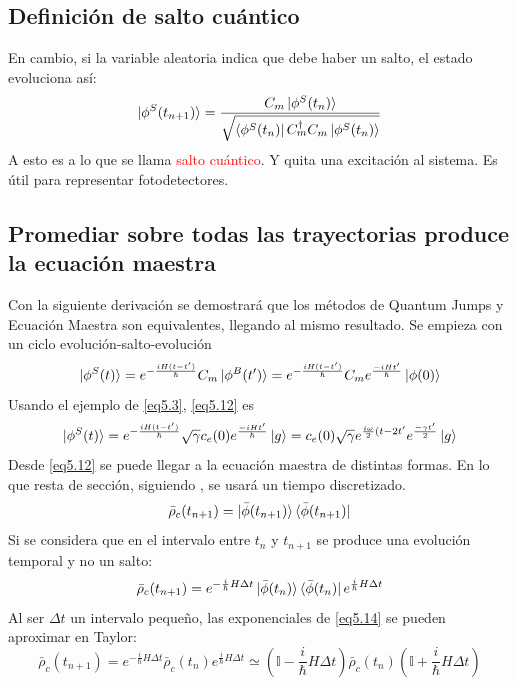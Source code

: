 \documentclass{book}
\begin{document}
\subsection{Definición de salto cuántico}
En cambio, si la variable aleatoria indica que debe haber un salto, el estado evoluciona así:
\begin{equation}\label{eq5.11}\ket{\phi^S(t_{n+1})}=\frac{C_m\ket{\phi^S(t_n)}}{\sqrt{\bra{\phi^S(t_n)}C_m^\dag C_m\ket{\phi^S(t_n)}}}\end{equation}
A esto es a lo que se llama \textcolor{red}{salto cuántico}. Y quita una excitación al sistema. Es útil para representar fotodetectores. 
\subsection{Promediar sobre todas las trayectorias produce la ecuación maestra}
Con la siguiente derivación se demostrará que los métodos de Quantum Jumps y Ecuación Maestra son equivalentes, llegando al mismo resultado. Se empieza con un ciclo evolución-salto-evolución
\begin{equation}\label{eq5.12}\ket{\phi^S(t)}=e^{-\frac{iH(t-t^\prime)}{\hslash}}C_m\ket{\phi^B(t^\prime)}=e^{-\frac{iH(t-t^\prime)}{\hslash}}C_me^{\frac{-iHt^\prime}{\hslash}}\ket{\phi(0)}\end{equation}
Usando el ejemplo de \ref{eq5.3}, \ref{eq5.12} es
\begin{equation}\label{eq5.13}\ket{\phi^S(t)}=e^{-\frac{iH(t-t^\prime)}{\hslash}}\sqrt{\gamma}c_e(0)e^{\frac{-iHt^\prime}{\hslash}}\ket{g}=c_e(0)\sqrt{\gamma}e^{\frac{i\omega}{2}(t-2t^\prime}e^{\frac{-\gamma t^{\prime}}{2}}\ket{g}\end{equation}
Desde \ref{eq5.12} se puede llegar a la ecuación maestra de distintas formas. En lo que resta de sección, siguiendo \cite{Orszag2}, se usará un tiempo discretizado.
\begin{equation}\label{eq5.14}\bar{\rho}_c(t_{n+1})=\ket{\bar{\phi}(t_{n+1})}\bra{\bar{\phi}(t_{n+1})}\end{equation}
Si se considera que en el intervalo entre $t_n$ y $t_{n+1}$ se produce una evolución temporal y no un salto:
\begin{equation}\label{eq5.15}\bar{\rho}_c(t_{n+1})=e^{-\frac{i}{\hslash}H\Delta t}\ket{\bar{\phi}(t_n)}\bra{\bar{\phi}(t_n)}e^{\frac{i}{\hslash}H\Delta t}\end{equation}
Al ser $\Delta t$ un intervalo pequeño, las exponenciales de \ref{eq5.14} se pueden aproximar en Taylor:
\begin{equation}\label{eq5.16}\bar{\rho}_c(t_{n+1})=e^{-\frac{i}{\hslash}H\Delta t}\bar{\rho}_c(t_n)e^{\frac{i}{\hslash}H\Delta t}\simeq (\mathbb{I}-\frac{i}{\hslash}H\Delta t)\bar{\rho}_c(t_n)(\mathbb{I}+\frac{i}{\hslash}H\Delta t)\end{equation}
\end{document}

